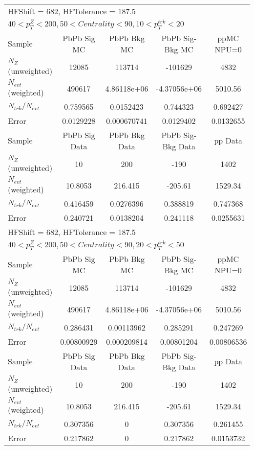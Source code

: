 \begin{table}[h!]
\centering
\begin{tabular}{|l|c|c|c|c|}
\multicolumn{5}{l}{ HFShift = 682, HFTolerance = 187.5}\\
\multicolumn{5}{l}{ $40 < p_{T}^{Z} < 200, 50 < Centrality < 90, 10 < p_{T}^{trk} < 20$}\\
\hline\hline
Sample         & PbPb Sig MC    & PbPb Bkg MC    & PbPb Sig-Bkg MC& ppMC NPU=0     \\
$N_Z$ (unweighted)& 12085          & 113714         & -101629        & 4832           \\
$N_{evt}$ (weighted)& 490617         & 4.86118e+06    & -4.37056e+06   & 5010.56        \\
$N_{trk}/N_{evt}$& 0.759565       & 0.0152423      & 0.744323       & 0.692427       \\
Error          & 0.0129228      & 0.000670741    & 0.0129402      & 0.0132655      \\
\hline
Sample         & PbPb Sig Data  & PbPb Bkg Data  & PbPb Sig-Bkg Data& pp Data  \\
$N_Z$ (unweighted)& 10             & 200            & -190           & 1402           \\
$N_{evt}$ (weighted)& 10.8053        & 216.415        & -205.61        & 1529.34        \\
$N_{trk}/N_{evt}$& 0.416459       & 0.0276396      & 0.388819       & 0.747368       \\
Error          & 0.240721       & 0.0138204      & 0.241118       & 0.0255631      \\
\hline\hline
\multicolumn{5}{l}{ HFShift = 682, HFTolerance = 187.5}\\
\multicolumn{5}{l}{ $40 < p_{T}^{Z} < 200, 50 < Centrality < 90, 20 < p_{T}^{trk} < 50$}\\
\hline\hline
Sample         & PbPb Sig MC    & PbPb Bkg MC    & PbPb Sig-Bkg MC& ppMC NPU=0     \\
$N_Z$ (unweighted)& 12085          & 113714         & -101629        & 4832           \\
$N_{evt}$ (weighted)& 490617         & 4.86118e+06    & -4.37056e+06   & 5010.56        \\
$N_{trk}/N_{evt}$& 0.286431       & 0.00113962     & 0.285291       & 0.247269       \\
Error          & 0.00800929     & 0.000209814    & 0.00801204     & 0.00806536     \\
\hline
Sample         & PbPb Sig Data  & PbPb Bkg Data  & PbPb Sig-Bkg Data& pp Data  \\
$N_Z$ (unweighted)& 10             & 200            & -190           & 1402           \\
$N_{evt}$ (weighted)& 10.8053        & 216.415        & -205.61        & 1529.34        \\
$N_{trk}/N_{evt}$& 0.307356       & 0              & 0.307356       & 0.261455       \\
Error          & 0.217862       & 0              & 0.217862       & 0.0153732      \\
\hline\hline
\end{tabular}
\end{table}
